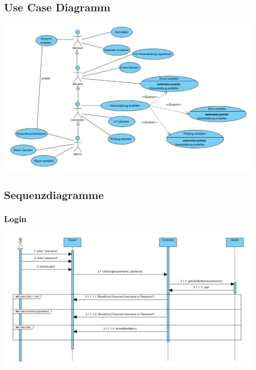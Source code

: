\documentclass[a4paper,12pt]{article}
\begin{document}
	\subsection*{Use Case Diagramm}
	\begin{center}
		\includegraphics[scale=.5,angle=90]{UseCaseDiagram.png}
	\end{center}
	\subsection*{Sequenzdiagramme}
		\subsubsection*{Login}
			\begin{center}
				\includegraphics[scale=.5]{SeqLogin.png}
			\end{center}
\end{document}
